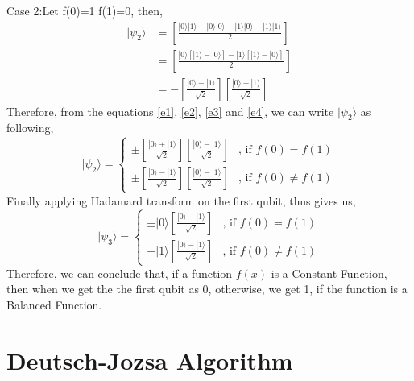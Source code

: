 \documentclass[12pt]{report}
\begin{document}
Case 2:\quad Let f(0)=1 f(1)=0, then,
\begin{equation}\label{e4}
\begin{split}
|\psi_{2}\rangle & = \left[\frac{|0\rangle|1\rangle - |0\rangle|0\rangle + |1\rangle|0\rangle - |1\rangle|1\rangle }{2}\right] \\
                        & = \left[\frac{|0\rangle\left[|1\rangle - |0\rangle\right] - |1\rangle\left[|1\rangle - |0\rangle\right]}{2}\right] \\
			& = - \left[\frac{|0\rangle -|1\rangle}{\sqrt{2}}\right]\left[\frac{|0\rangle-|1\rangle}{\sqrt{2}}\right] 
\end{split}
\end{equation}\newline
Therefore, from the equations \ref{e1}, \ref{e2}, \ref{e3} and \ref{e4}, we can write $|\psi_{2}\rangle$ as following,
\begin{equation}
|\psi_{2}\rangle =
		\begin{cases}
			\pm\left[\frac{|0\rangle+|1\rangle}{\sqrt{2}}\right]\left[\frac{|0\rangle-|1\rangle}{\sqrt{2}}\right] & \text{, if $f(0)=f(1)$} \\
			\pm\left[\frac{|0\rangle-|1\rangle}{\sqrt{2}}\right]\left[\frac{|0\rangle-|1\rangle}{\sqrt{2}}\right]  & \text{, if  $f(0) \ne f(1)$}
		\end{cases}
\end{equation}
\newline Finally applying Hadamard transform on the first qubit, thus gives us,
\begin{equation}
|\psi_{3}\rangle =
		\begin{cases}
			\pm|0\rangle\left[\frac{|0\rangle-|1\rangle}{\sqrt{2}}\right] & \text{, if $f(0)=f(1)$} \\
			\pm|1\rangle\left[\frac{|0\rangle-|1\rangle}{\sqrt{2}}\right]  & \text{, if  $f(0) \ne f(1)$}
		\end{cases}
\end{equation}
\newline Therefore, we can conclude that, if a function $f(x)$ is a Constant Function, then when we get the the first qubit as 0, otherwise, we get 1, if the function is a Balanced Function.\\
\section{Deutsch-Jozsa Algorithm}
\end{document}
